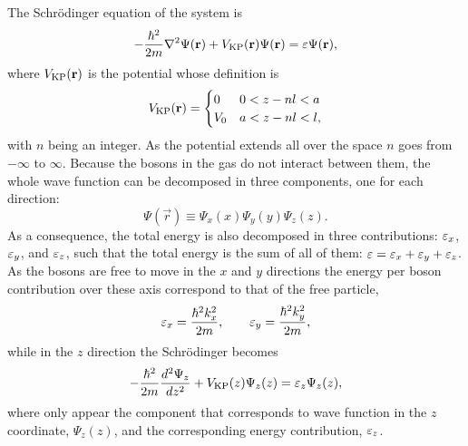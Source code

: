 The Schrödinger equation of the system is
%
\begin{equation}
  -\frac{\hbar^2}{2m} \nabla^2 \Psi(\mathbf r) + V_{\mathrm{KP}}(\mathbf r) \Psi(\mathbf r) = {\varepsilon} \Psi(\mathbf r),
\end{equation}
%
where $V_{\mathrm{KP}}(\mathbf r)$ is the {\KP} potential whose definition is
%
\begin{equation}
  \label{eq:kronig-penney-potential}
  V_{\mathrm{KP}}(\mathbf r) = \begin{cases}
    0   & 0 < z - nl < a  \\
    V_0 & a < z - nl < l,
  \end{cases}
\end{equation}
%
with $n$ being an integer. As the potential extends all over the space $n$ goes
from $-\infty$ to $\infty$. Because the bosons in the gas do not interact
between them, the whole wave function can be decomposed in three components, one
for each direction:
%
\begin{equation}
  \Psi(\vec r) \equiv \Psi_x(x) \Psi_y(y) \Psi_z(z).
\end{equation}
%
As a consequence, the total energy is also decomposed in three contributions:
${{\varepsilon}_x}$, ${{\varepsilon}_y}$, and ${\varepsilon}_{z}$, such that the total energy is the sum of all of them:
${\varepsilon} = {{\varepsilon}_x} + {{\varepsilon}_y} + {\varepsilon}_{z}$. As the bosons are free to move in the $x$ and $y$
directions the energy per boson contribution over these axis correspond to that
of the free particle,
%
\begin{equation}
  {{\varepsilon}_x} = \frac{\hbar^2 k_x^2}{2m},  \qquad {{\varepsilon}_y} = \frac{\hbar^2 k_y^2}{2m},
\end{equation}
%
while in the $z$ direction the Schrödinger becomes
%
\begin{equation}
  -\frac{\hbar^2}{2m} \frac{d^2 \Psi_z}{dz^2} + V_{\mathrm{KP}}(z) \Psi_z(z) = {\varepsilon}_{z} \Psi_z(z),
\end{equation}
%
where only appear the component that corresponds to wave function in the $z$
coordinate, $\Psi_z(z)$, and the corresponding energy contribution, ${\varepsilon}_{z}$.


